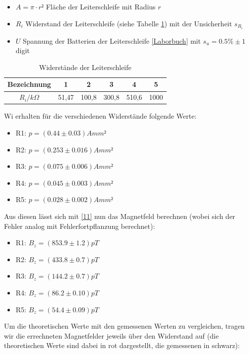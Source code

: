 \documentclass[12pt]{article}
\begin{document}
\begin{itemize}
\item $A = \pi \cdot r² $ Fläche der Leiterschleife mit Radius $r$
\item $R_i$ Widerstand der Leiterschleife (siehe Tabelle \ref{Tab}) mit der Unsicherheit $s_{R_i}$
\item$U$ Spannung der Batterien der Leiterschleife \ref{Laborbuch} mit $s_u = 0.5 \% \pm 1$ digit
\end{itemize}

\begin{table}[h!]
	\centering
	\begin{tabular}{c|c|c|c|c|c}
	Bezeichnung& 1& 2& 3& 4& 5 \\ \hline
	$R_i/k \Omega$ & 51,47&	100,8& 300,8 & 510,6 & 1000\\ 
	\end{tabular} 
\caption{Widerstände der Leiterschleife}	\label{Tab}
\end{table}

Wi erhalten für die verschiedenen Widerstände folgende Werte: 

\begin{itemize}
\item R1: $p = (0.44 \pm 0.03) A mm²$
\item R2: $p = (0.253 \pm 0.016) A mm²$
\item R3: $p = (0.075 \pm 0.006) A mm²$
\item R4: $p = (0.045 \pm 0.003) A mm²$
\item R5: $p = (0.028 \pm 0.002) A mm²$
\end{itemize}

Aus diesen lässt sich mit \ref{11} nun das Magnetfeld berechnen (wobei sich der Fehler analog mit Fehlerfortpflanzung berechnet):

\begin{itemize}
\item R1: $B_z = (853.9 \pm 1.2) pT$
\item R2: $B_z = (433.8 \pm 0.7) pT$
\item R3: $B_z = (144.2 \pm 0.7) pT$
\item R4: $B_z = (86.2 \pm 0.10) pT$
\item R5: $B_z = (54.4 \pm 0.09) pT$
\end{itemize}

 Um die theoretischen Werte mit den gemessenen Werten zu vergleichen, tragen wir die errechneten Magnetfelder jeweils über den Widerstand auf (die theoretischen Werte sind dabei in rot dargestellt, die gemessenen in schwarz):
\end{document}
